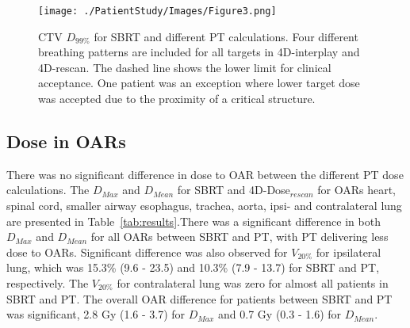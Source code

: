 \newpage
\begin{figure}[H]
\begin{center}
\texttt{[image: ./PatientStudy/Images/Figure3.png]}
\caption{CTV $D_{99\%}$ for SBRT and different PT calculations. Four different breathing patterns are included for all targets in 4D-interplay and 4D-rescan. The dashed line shows the lower limit for clinical acceptance. One patient was an exception where lower target dose was accepted due to the proximity of a critical structure.  }
\label{Fig:InterplayDiff}
\end{center}
\end{figure}

\subsection{Dose in OARs}


There was no significant difference in dose to OAR between the different PT dose calculations. 
The $D_{Max}$ and $D_{Mean}$ for SBRT and 4D-Dose$_{rescan}$ for OARs heart, spinal cord, smaller airway esophagus, trachea, aorta, ipsi- and contralateral lung are 
presented in Table~\ref{tab:results}.There was a significant difference in both $D_{Max}$ and $D_{Mean}$ for all OARs between SBRT and PT, with 
PT delivering less dose to OARs. Significant difference was also observed for $V_{20\%}$ for ipsilateral lung, which was 15.3\% (9.6 - 23.5) and 10.3\% (7.9 - 13.7) for SBRT and PT, 
respectively. The $V_{20\%}$ for contralateral lung was zero for almost all patients in SBRT and PT. The overall OAR difference for patients between SBRT and PT 
was significant, 2.8 Gy (1.6 - 3.7)  for $D_{Max}$ and 0.7 Gy (0.3 - 1.6) for $D_{Mean}$. 

\newpage

